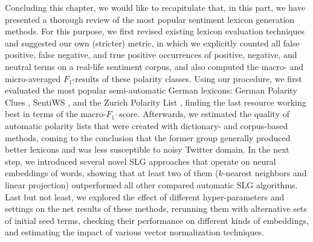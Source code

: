 \documentclass[11pt]{article}
\newcommand{\F}[0]{$F_1$}
\begin{document}
Concluding this chapter, we would like to recapitulate that, in this
part, we have presented a thorough review of the most popular
sentiment lexicon generation methods.  For this purpose, we first
revised existing lexicon evaluation techniques and suggested our own
(stricter) metric, in which we explicitly counted all false positive,
false negative, and true positive occurrences of positive, negative,
and neutral terms on a real-life sentiment corpus, and also computed
the macro- and micro-averaged \F-results of these polarity classes.
Using our procedure, we first evaluated the most popular
semi-automatic German lexicons: German Polarity Clues
\cite{Waltinger:10}, SentiWS \cite{Remus:10}, and the Zurich Polarity
List \cite{Clematide:10}, finding the last resource working best in
terms of the macro-\F--score.  Afterwards, we estimated the quality of
automatic polarity lists that were created with dictionary- and
corpus-based methods, coming to the conclusion that the former group
generally produced better lexicons and was less susceptible to noisy
Twitter domain.  In the next step, we introduced several novel SLG
approaches that operate on neural embeddings of words, showing that at
least two of them ($k$-nearest neighbors and linear projection)
outperformed all other compared automatic SLG algorithms.  Last but
not least, we explored the effect of different hyper-parameters and
settings on the net results of these methods, rerunning them with
alternative sets of initial seed terms, checking their performance on
different kinds of embeddings, and estimating the impact of various
vector normalization techniques.
\end{document}
